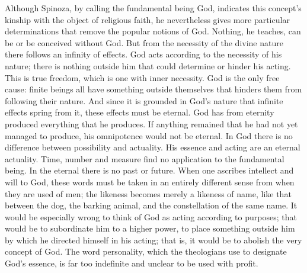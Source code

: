 \documentclass[12pt]{book}
\newcommand{\opage}[1]{\marginnote{\footnotesize\textit{[#1]}}}
\begin{document}
Although Spinoza, by calling the fundamental being God, \opage{82}indicates this
concept's kinship with the object of religious faith, he nevertheless gives more
particular determinations that remove the popular notions of God. Nothing, he teaches,
can be or be conceived without God. But from the necessity of the divine nature there
follows an infinity of effects. God acts according to the necessity of his nature;
there is nothing outside him that could determine or hinder his acting. This is true
freedom, which is one with inner necessity. God is the only free cause: finite beings
all have something outside themselves that hinders them from following their nature.
And since it is grounded in God's nature that infinite effects spring from it, these
effects must be eternal. God has from eternity produced everything that he produces. If
anything remained that he had not yet managed to produce, his omnipotence would not be
eternal. In God there is no difference between possibility and actuality. His essence
and acting are an eternal actuality. Time, number and measure find no application to
the fundamental being. In the eternal there is no past or future. When one ascribes
intellect and will to God, these words must be taken in an entirely different sense
from when they are used of men; the likeness becomes merely a likeness of name, like
that between the dog, the barking animal, and the constellation of the same name. It
would be especially wrong to think of God as acting according to purposes; that would be
to subordinate him to a higher power, to place something outside him by which he
directed himself in his acting; that is, it would be to abolish the very concept of
God. The word personality, which the theologians use to designate \opage{83}God's
essence, is far too indefinite and unclear to be used with profit.
\end{document}

